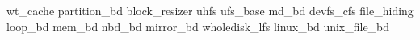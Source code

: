 \section{\Modules}
\label{sec:modules}


wt\_cache
partition\_bd
block\_resizer
uhfs
ufs\_base
md\_bd
devfs\_cfs
file\_hiding
loop\_bd
mem\_bd
nbd\_bd
mirror\_bd
wholedisk\_lfs
linux\_bd
unix\_file\_bd




